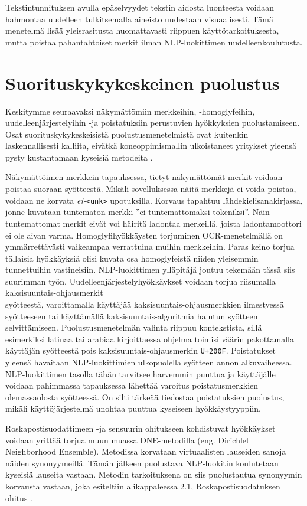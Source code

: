 Tekstintunnituksen avulla epäselvyydet tekstin aidosta luonteesta voidaan hahmontaa uudelleen tulkitsemalla aineisto uudestaan visuaalisesti. Tämä menetelmä lisää yleisrasitusta huomattavasti riippuen käyttötarkoituksesta, mutta poistaa pahantahtoiset merkit ilman NLP-luokittimen uudelleenkoulutusta. \citep{boucher2021bad}

\section{Suorituskykykeskeinen puolustus}
Keskitymme seuraavaksi näkymättömiin merkkeihin, -homoglyfeihin, \-uudelleenjärjestelyihin -ja poistatuksiin perustuvien hyökkyksien puolustamiseen. Osat suorituskykykeskeisistä puolustusmenetelmistä ovat kuitenkin laskennallisesti kalliita, eivätkä koneoppimismallin ulkoistaneet yritykset yleensä pysty kustantamaan kyseisiä metodeita \citep{https://doi.org/10.48550/arxiv.1911.07399}.

Näkymättöimen merkkein tapauksessa, tietyt näkymättömät merkit voidaan poistaa suoraan syötteestä. Mikäli sovelluksessa näitä merkkejä ei voida poistaa, voidaan ne korvata \textit{ei-}\texttt{<unk>} upotuksilla. Korvaus tapahtuu lähdekielisanakirjassa, jonne kuvataan tuntematon merkki ''ei-tuntemattomaksi tokeniksi''. Näin tuntemattomat merkit eivät voi häiritä ladontaa merkeillä, joista ladontamoottori ei ole aivan varma. Homoglyfihyökkäysten torjuminen OCR-menetelmällä on ymmärrettävästi vaikeampaa verrattuina muihin merkkeihin. Paras keino torjua tällaisia hyökkäyksiä olisi kuvata osa homoglyfeistä niiden yleisemmin tunnettuihin vastineisiin. NLP-luokittimen ylläpitäjä joutuu tekemään tässä siis suurimman työn. Uudelleenjärjestelyhyökkäykset voidaan torjua riisumalla kaksisuuntais-ohjausmerkit\\syötteestä, varoittamalla käyttäjää kaksisuuntais-ohjausmerkkien ilmestyessä syötteeseen tai käyttämällä kaksisuuntais-algoritmia halutun syötteen selvittämiseen. Puolustusmenetelmän valinta riippuu kontekstista, sillä esimerkiksi latinaa tai arabiaa kirjoittaessa ohjelma toimisi väärin pakottamalla käyttäjän syötteestä pois kaksisuuntais-ohjausmerkin \texttt{U+200F}. Poistatukset yleensä havaitaan NLP-luokittimien ulkopuolella syötteen annon alkuvaiheessa. NLP-luokittimen tasolla tähän tarvitsee harvemmin puuttua ja käyttäjälle voidaan pahimmassa tapauksessa lähettää varoitus poistatusmerkkien olemassaolosta syötteessä. On silti tärkeää tiedostaa poistatuksien puolustus, mikäli käyttöjärjestelmä unohtaa puuttua kyseiseen hyökkäystyyppiin. \citep{boucher2021bad}

Roskapostisuodattimeen -ja sensuurin ohitukseen kohdistuvat hyökkäykset voidaan yrittää torjua muun muassa DNE-metodilla (eng. Dirichlet Neighborhood Ensemble). Metodissa korvataan virtuaalisten lauseiden sanoja näiden synonyymeillä. Tämän jälkeen puolustava NLP-luokitin koulutetaan kyseisiä lauseita vastaan. Metodin tarkoituksena on siis puolustautua synonyymin korvausta vastaan, joka esiteltiin alikappaleessa 2.1, Roskapostisuodatuksen ohitus \citep{dnedefense}.